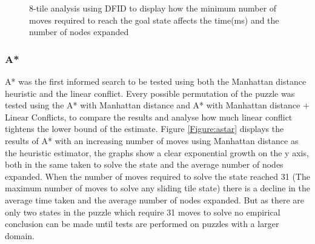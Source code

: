 \documentclass[final]{cmpreport}
\begin{document}
\begin{figure}[!ht]
	\centering 
	\begin{subfigure}[t]{0.5\textwidth}
	\end{subfigure}%
	\caption{8-tile analysis using DFID to display how the minimum number of moves required to reach the goal state affects the time(ms) and the number of nodes expanded}
	\label{fig:dfidres}
\end{figure} 





\subsubsection{A*}
A* was the first informed search to be tested using both the Manhattan distance heuristic and the linear conflict. Every possible permutation of the puzzle was tested using the A* with Manhattan distance and A* with Manhattan distance + Linear Conflicts, to compare the results and analyse how much linear conflict tightens the lower bound of the estimate. Figure \ref{Figure:astar} displays the results of A* with an increasing number of moves using Manhattan distance as the heuristic estimator, the graphs show a clear exponential growth on the y axis, both in the same taken to solve the state and the average number of nodes expanded. When the number of moves required to solve the state reached 31 (The maximum number of moves to solve any sliding tile state) there is a decline in the average time taken and the average number of nodes expanded. But as there are only two states in the puzzle which require 31 moves to solve no empirical conclusion can be made until tests are performed on puzzles with a larger domain.
\end{document}
